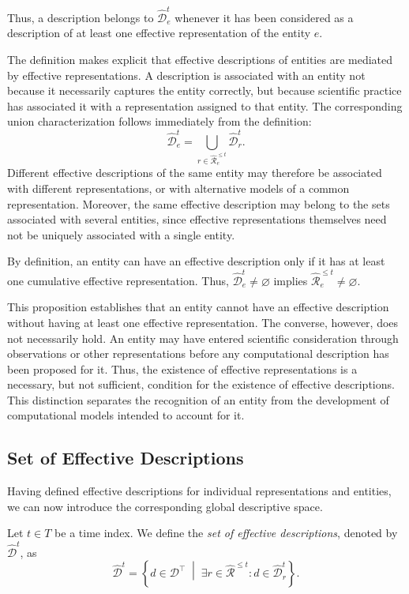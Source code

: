 Thus, a description belongs to $\hat{\mathcal{D}}_e^t$ whenever it has been considered as a description of at least one effective representation of the entity $e$.

The definition makes explicit that effective descriptions of entities are mediated by effective representations. A description is associated with an entity not because it necessarily captures the entity correctly, but because scientific practice has associated it with a representation assigned to that entity. The corresponding union characterization follows immediately from the definition:
\[
\hat{\mathcal{D}}_e^t = \bigcup_{r\in\hat{\mathcal{R}}_e^{\leq t}} \hat{\mathcal{D}}_r^t.
\]
Different effective descriptions of the same entity may therefore be associated with different representations, or with alternative models of a common representation. Moreover, the same effective description may belong to the sets associated with several entities, since effective representations themselves need not be uniquely associated with a single entity.

By definition, an entity can have an effective description only if it has at least one cumulative effective representation. Thus, $\hat{\mathcal{D}}_e^t\neq\varnothing$ implies $\hat{\mathcal{R}}_e^{\leq t}\neq\varnothing$.

This proposition establishes that an entity cannot have an effective description without having at least one effective representation. The converse, however, does not necessarily hold. An entity may have entered scientific consideration through observations or other representations before any computational description has been proposed for it. Thus, the existence of effective representations is a necessary, but not sufficient, condition for the existence of effective descriptions. This distinction separates the recognition of an entity from the development of computational models intended to account for it.


\subsection*{Set of Effective Descriptions}

Having defined effective descriptions for individual representations and entities, we can now introduce the corresponding global descriptive space.

\begin{definition}
\label{def:set_of_effective_descriptions}
Let $t\in T$ be a time index. We define the \emph{set of effective descriptions}, denoted by $\hat{\mathcal{D}}^t$, as
\[
\hat{\mathcal{D}}^t = \left\{d\in\mathcal{D}^\top \;\middle|\;
\exists r\in\hat{\mathcal{R}}^{\leq t}: d\in\hat{\mathcal{D}}_r^t \right\}.
\]
\end{definition}


